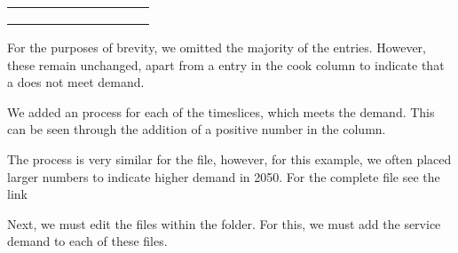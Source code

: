 \documentclass[letterpaper,10pt,english]{sphinxmanual}
\begin{document}
\begin{savenotes}
\begin{tabulary}{\linewidth}[t]{|T|T|T|T|T|T|T|T|T|T|}
&
&
&
&
&
&
&
&
\\
\hline
{}
&
&
&
&
&
&
&
&
&
\\
\hline
{}
&
&
&
&
&
&
&
&
&
\\
\hline
{}
&
&
&
&
&
&
&
&
&
\\
\hline
\end{tabulary}
\par
\sphinxattableend\end{savenotes}

For the purposes of brevity, we omitted the majority of the  entries. However, these remain unchanged, apart from a  entry in the cook column to indicate that a  does not meet  demand.

We added an  process for each of the timeslices, which meets the  demand. This can be seen through the addition of a positive number in the  column.

The process is very similar for the  file, however, for this example, we often placed larger numbers to indicate higher demand in 2050. For the complete file see the link 

Next, we must edit the files within the  folder. For this, we must add the  service demand to each of these files.
\end{document}
